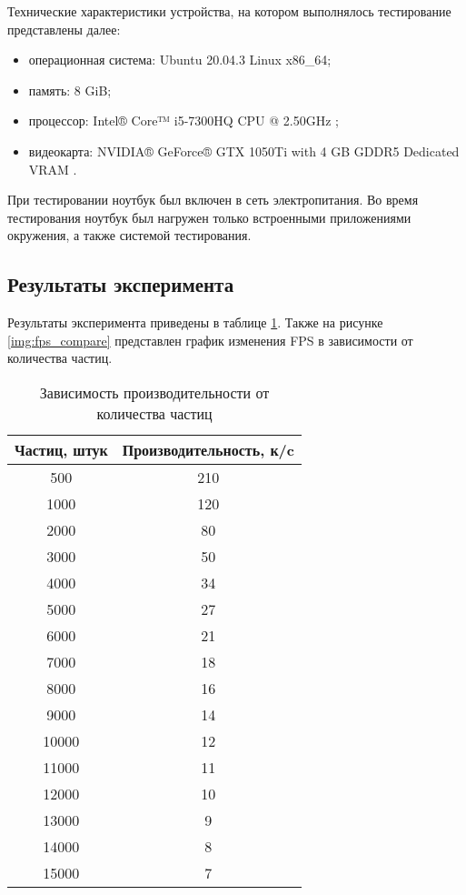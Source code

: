 Технические характеристики устройства, на котором выполнялось тестирование представлены далее:

\begin{itemize}
    \item операционная система: Ubuntu 20.04.3 \cite{ubuntu} Linux \cite{linux} x86\_64;
    \item память: 8 GiB;
    \item процессор: Intel® Core™ i5-7300HQ CPU @ 2.50GHz \cite{intel};
    \item видеокарта: NVIDIA® GeForce® GTX 1050Ti with 4 GB GDDR5 Dedicated VRAM \cite{gtx1050}.
\end{itemize}

При тестировании ноутбук был включен в сеть электропитания. Во время тестирования ноутбук был нагружен только встроенными приложениями окружения, а также системой тестирования.


\subsection{Результаты эксперимента}

Результаты эксперимента приведены в таблице \ref{tbl:fps_compare}. Также на рисунке \ref{img:fps_compare} представлен график изменения FPS в зависимости от количества частиц.

\begin{center}
    \captionsetup{justification=raggedright,singlelinecheck=off}
    \begin{longtable}[c]{|c|c|}
    \caption{Зависимость производительности от количества частиц\label{tbl:fps_compare}}\\ \hline
        \textbf{Частиц, штук} & \textbf{Производительность, к/c} \\ \hline
        500   & 210 \\ \hline
        1000  & 120 \\ \hline
        2000  & 80 \\ \hline
        3000  & 50 \\ \hline
        4000  & 34 \\ \hline
        5000  & 27 \\ \hline
        6000  & 21 \\ \hline
        7000  & 18 \\ \hline
        8000  & 16 \\ \hline
        9000  & 14 \\ \hline
        10000 & 12 \\ \hline
        11000 & 11 \\ \hline
        12000 & 10 \\ \hline
        13000 & 9 \\ \hline
        14000 & 8 \\ \hline
        15000 & 7 \\ \hline
\end{longtable}
\end{center}

